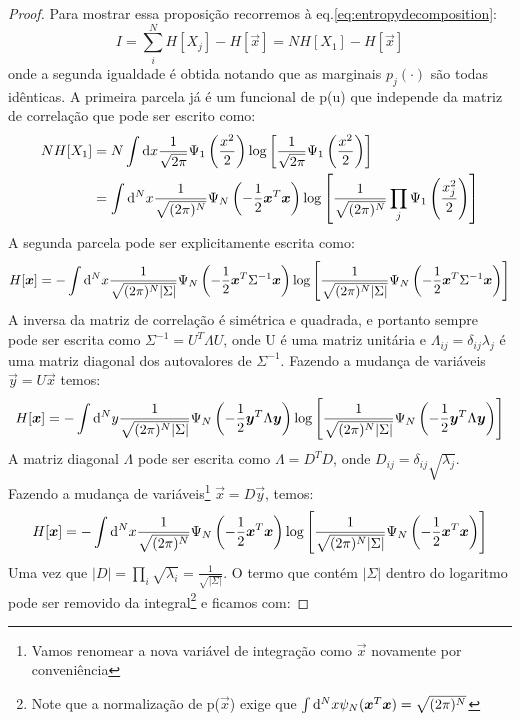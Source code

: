 \begin{proof}
Para mostrar essa proposição recorremos à eq.\eqref{eq:entropydecomposition}:
\begin{equation*}
I = \sum_{i}^{N}H[X_j] - H[\vec{x}] = N H[X_1] - H[\vec{x}]
\end{equation*}
onde a segunda igualdade é obtida notando que as marginais $p_j(\cdot)$ são todas idênticas. A primeira parcela já é um funcional de p(u) que independe da matriz de correlação que pode ser escrito como: 
\begin{align*}
N H[X_1] &= N\int \mathrm{d} x \frac{1}{\sqrt{2\pi}} \Psi_{1}\left(\frac{x^2}{2}\right) \log\left[\frac{1}{\sqrt{2\pi}} \Psi_{1}\left(\frac{x^2}{2}\right)\right] \\
	 &= \int \mathrm{d}^N x \frac{1}{\sqrt{(2\pi)^N}} \Psi_{N}\left(-\frac{1}{2} \bm{x}^{T}\bm{x}\right) \log\left[\frac{1}{\sqrt{(2\pi)^N}}\prod_j \Psi_{1}\left(\frac{x_j^2}{2}\right)\right]
\end{align*}
A segunda parcela pode ser explicitamente escrita como:
\begin{equation*}
 H[\bm{x}] = - \int \mathrm{d}^N x \frac{1}{\sqrt{(2\pi)^N |\Sigma|}} \Psi_{N}\left(-\frac{1}{2} \bm{x}^{T}\Sigma^{-1}\bm{x}\right) \log\left[\frac{1}{\sqrt{(2\pi)^N |\Sigma|}} \Psi_{N}\left(-\frac{1}{2} \bm{x}^{T}\Sigma^{-1}\bm{x}\right)\right]
\end{equation*}
A inversa da matriz de correlação é simétrica e quadrada, e portanto sempre pode ser escrita como $\Sigma^{-1} = U^{T} \Lambda U$, onde U é uma matriz unitária e $\Lambda_{ij} = \delta_{ij}\lambda_j$ é uma matriz diagonal dos autovalores de $\Sigma^{-1}$. Fazendo a mudança de variáveis $\vec{y} = U\vec{x}$ temos:
\[
H[\bm{x}] = - \int \mathrm{d}^N y \frac{1}{\sqrt{(2\pi)^N |\Sigma|}} \Psi_{N}\left(-\frac{1}{2} \bm{y}^{T}\Lambda\bm{y}\right) \log\left[\frac{1}{\sqrt{(2\pi)^N |\Sigma|}} \Psi_{N}\left(-\frac{1}{2} \bm{y}^{T}\Lambda\bm{y}\right)\right]
\]
A matriz diagonal $\Lambda$ pode ser escrita como $\Lambda = D^{T} D$, onde $D_{ij} = \delta_{ij}\sqrt{\lambda_j}$. Fazendo a mudança de variáveis\footnote{Vamos renomear a nova variável de integração como $\vec{x}$ novamente por conveniência} $\vec{x}= D\vec{y}$, temos:
\begin{equation*}
 H[\bm{x}] = - \int \mathrm{d}^N x \frac{1}{\sqrt{(2\pi)^N}} \Psi_{N}\left(-\frac{1}{2} \bm{x}^{T}\bm{x}\right) \log\left[\frac{1}{\sqrt{(2\pi)^N |\Sigma|}} \Psi_{N}\left(-\frac{1}{2} \bm{x}^{T}\bm{x}\right)\right]
\end{equation*}
Uma vez que $|D| = \prod_{i} \sqrt{\lambda_i} = \frac{1}{\sqrt{|\Sigma|}}$. O termo que contém $|\Sigma|$ dentro do logaritmo pode ser removido da integral\footnote[][-2cm]{Note que a normalização de p($\vec{x}$) exige que $\int \mathrm{d}^N x \psi_{N}(\bm{x}^{T}\bm{x}) = \sqrt{(2\pi)^N}$} e ficamos com:

\end{proof}
